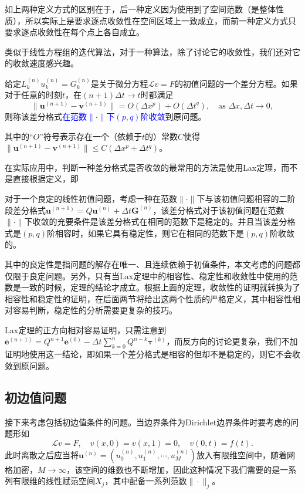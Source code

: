 \documentclass[a4paper,10pt]{ctexart}
\begin{document}
如上两种定义方式的区别在于，后一种定义因为使用到了空间范数（是整体性质），所以实际上是要求逐点收敛性在空间区域上一致成立，而前一种定义方式只要求逐点收敛性在每个点上各自成立。

类似于线性方程组的迭代算法，对于一种算法，除了讨论它的收敛性，我们还对它的收敛速度感兴趣。

\begin{definition}
    给定$ L_k^{(n)}u^{(n)}_k = G^{(n)}_k $是关于微分方程$ \mathcal{L}v=F $的初值问题的一个差分方程。如果对于任意的时刻$ t $，在$ (n+1)\Delta t\to t $时都满足
    \begin{equation}
        \| \bm{u}^{(n+1)} - \bm{v}^{(n+1)} \| = O(\Delta x^p) + O(\Delta t^q), \quad \text{as } \Delta x,\Delta t\longrightarrow 0,
    \end{equation}
    则称该差分格式\textcolor{blue}{在范数$ \| \cdot \| $下$ (p,q) $阶收敛}到原问题。
\end{definition}
\noindent 其中的“$ O $”符号表示存在一个（依赖于$ t $的）常数$ C $使得$ \| \bm{u}^{(n+1)} - \bm{v}^{(n+1)} \| \leq C(\Delta x^p + \Delta t^q) $。

在实际应用中，判断一种差分格式是否收敛的最常用的方法是使用Lax定理，而不是直接根据定义，即
\begin{theorem}
    对于一个良定的线性初值问题，考虑一种在范数$ \| \cdot \| $下与该初值问题相容的二阶段差分格式$ \bm{u}^{(n+1)} = Q \bm{u}^{(n)} + \Delta t \bm{G}^{(n)} $，该差分格式对于该初值问题在范数$ \| \cdot \| $下收敛的充要条件是该差分格式在相同的范数下是稳定的。并且当该差分格式是$ (p,q) $阶相容时，如果它具有稳定性，则它在相同的范数下是$ (p,q) $阶收敛的。
\end{theorem}
\noindent 其中的良定性是指问题的解存在唯一、且连续依赖于初值条件，本文考虑的问题都仅限于良定问题。另外，只有当Lax定理中的相容性、稳定性和收敛性中使用的范数是一致的时候，定理的结论才成立。根据上面的定理，收敛性的证明就转换为了相容性和稳定性的证明，在后面两节将给出这两个性质的严格定义，其中相容性相对容易判断，稳定性的分析需要更复杂的技巧。

Lax定理的正方向相对容易证明，只需注意到$ \bm{e}^{(n+1)} = Q^{n+1}\bm{e}^{(0)} - \Delta t\sum_{k=0}^n Q^{n-k}\bm{\tau}^{(k)} $，而反方向的讨论更复杂，我们不加证明地使用这一结论，即如果一个差分格式是相容的但却不是稳定的，则它不会收敛到原问题。

\subsection{初边值问题}
接下来考虑包括初边值条件的问题。当边界条件为Dirichlet边界条件时要考虑的问题形如
\[
    \mathcal{L}v = F,\quad v(x,0) = v(x,1)=0,\quad v(0,t) = f(t).
\]
此时离散之后应当将$ \bm{u}^{(n)} = (u_0^{(n)},u_1^{(n)},\cdots ,u_M^{(n)}) $放入有限维空间中，随着网格加密，$ M\to\infty $，该空间的维数也不断增加，因此这种情况下我们需要的是一系列有限维的线性赋范空间$ X_j $，其中配备一系列范数$ \| \cdot \|_j $。
\end{document}
